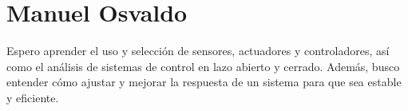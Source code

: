 \section{Manuel Osvaldo}
Espero aprender el uso y selección de sensores, actuadores y controladores, así como el análisis de sistemas de control en lazo abierto y cerrado. Además, busco entender cómo ajustar y mejorar la respuesta de un sistema para que sea estable y eficiente.